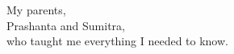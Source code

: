 \documentclass[final,numrefs,sort&compress]{nddiss2e}
\begin{document}
\renewcommand{\dedicationname}{Dedicated to}

\begin{dedication}
  My parents,\\ Prashanta and Sumitra,\\ who taught me everything I needed to know.
\end{dedication}

\tableofcontents
\listoffigures
\listoftables


\end{document}

